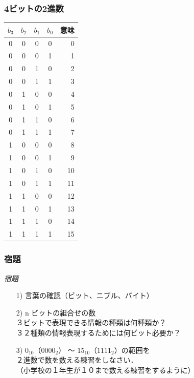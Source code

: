 \documentclass[handout]{beamer}        %
\begin{document}
\begin{frame}
  \frametitle{4ビットの2進数}
  \begin{center}
    {\small\begin{tabular}{c|c|c|c|r}
      \hline\hline
      $b_3$ & $b_2$ & $b_1$ & $b_0$ & 意味\\
      \hline
      0 &  0 &  0 &  0 &  0 \\
      0 &  0 &  0 &  1 &  1 \\
      0 &  0 &  1 &  0 &  2 \\
      0 &  0 &  1 &  1 &  3 \\
      0 &  1 &  0 &  0 &  4 \\
      0 &  1 &  0 &  1 &  5 \\
      0 &  1 &  1 &  0 &  6 \\
      0 &  1 &  1 &  1 &  7 \\
      1 &  0 &  0 &  0 &  8 \\
      1 &  0 &  0 &  1 &  9 \\
      1 &  0 &  1 &  0 & 10 \\
      1 &  0 &  1 &  1 & 11 \\
      1 &  1 &  0 &  0 & 12 \\
      1 &  1 &  0 &  1 & 13 \\
      1 &  1 &  1 &  0 & 14 \\
      1 &  1 &  1 &  1 & 15 \\
    \end{tabular}}
  \end{center}
\end{frame}

\begin{frame}
  \frametitle{宿題}

\emph{宿題}
\begin{enumerate}
\item[1)] 言葉の確認（ビット、ニブル、バイト）
\vfill
\item[2)] n ビットの組合せの数 \\
  ３ビットで表現できる情報の種類は何種類か？ \\
  ３２種類の情報表現するためには何ビット必要か？
\vfill
\item[3)] $0_{10}$（$0000_2$） 〜 $15_{10}$（$1111_2$）の範囲を \\
  ２進数で数を数える練習をしなさい．\\
  （小学校の１年生が１０まで数える練習をするように）
\vfill
\end{enumerate}
\end{frame}
\end{document}
